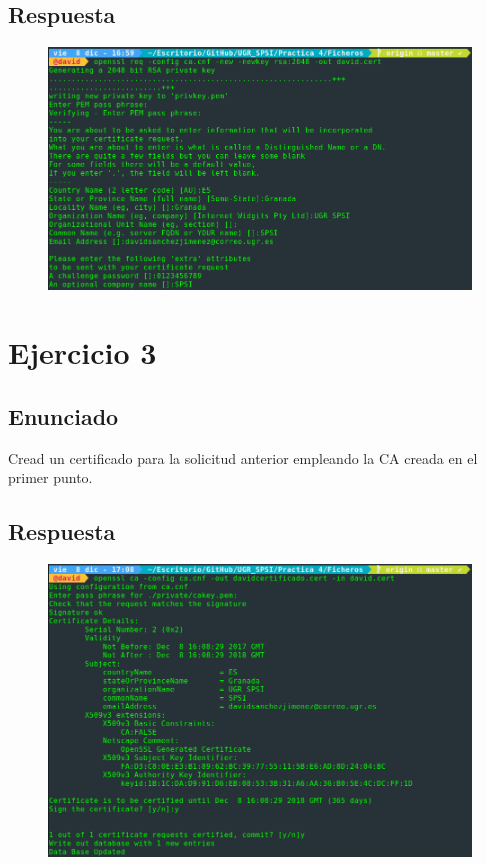 \documentclass[10pt,a4paper,spanish]{report}
\begin{document}
\section{Respuesta}
\noindent

\begin{figure}[!hbp]
 \centering  \includegraphics[width=1\textwidth]{./Imagenes/2.png}
\end{figure}

\chapter{Ejercicio 3}

\section{Enunciado}
\noindent
Cread un certificado para la solicitud anterior empleando la CA creada en el primer punto.

\section{Respuesta}
\noindent

\begin{figure}[!hbp]
 \centering  \includegraphics[width=1\textwidth]{./Imagenes/3.png}
\end{figure}
\end{document}
